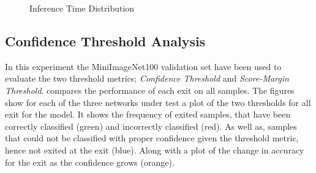 \begin{figure}
	\caption[Inference Time Distribution]{Inference Time Distribution}
	\label{fig:inference-time-dist}
\end{figure}


%
%
%


\subsection{Confidence Threshold Analysis}

In this experiment the MiniImageNet100 validation set have been used to evaluate the two threshold metrics; \emph{Confidence Threshold} and \emph{Score-Margin Threshold}.  compares the performance of each exit on all samples. The figures show for each of the three networks under test a plot of the two thresholds for all exit for the model. It shows the frequency of exited samples, that have been correctly classified ({\color{sns-green}green}) and incorrectly classified ({\color{sns-red}red}). As well as, samples that could not be classified with proper confidence given the threshold metric, hence not exited at the exit ({\color{sns-blue}blue}). Along with a plot of the change in accuracy for the exit as the confidence grows ({\color{sns-orange}orange}).  

